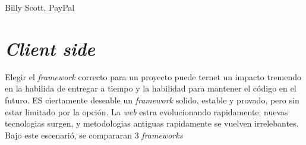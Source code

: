 %
%
%
%
%
%
%
%
%
%
%
%
%
%
%
%
%
%
%
%
%
%
%
%
%
Billy Scott, PayPal

\section{\textit{Client side}}

Elegir el \textit{framework} correcto para un proyecto puede ternet un impacto tremendo en la habilida de entregar a tiempo y la habilidad para mantener el código en el futuro. ES ciertamente deseable un \textit{framework }solido, estable y provado, pero sin estar limitado por la opción. La \textit{web} estra evolucionando rapidamente; nuevas tecnologias surgen, y metodologias antiguas rapidamente se vuelven irrelebantes. Bajo este escenarió, se compararan 3 \textit{frameworks}

